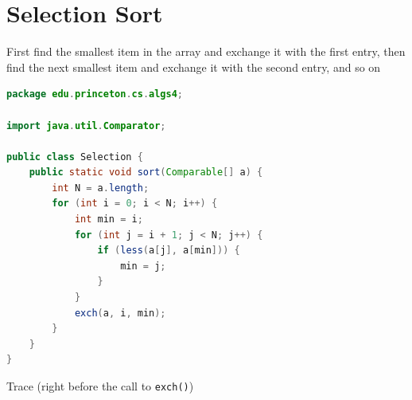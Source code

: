 \documentclass[8pt,a4paper,compress]{beamer}
\begin{document}
\section{Selection Sort}
\begin{frame}[fragile]
\pause

First find the smallest item in the array and exchange it with the first entry, then find the next smallest item and exchange it with the second entry, and so on

\pause
\bigskip

\begin{lstlisting}[language=Java]
package edu.princeton.cs.algs4;

import java.util.Comparator;

public class Selection {
    public static void sort(Comparable[] a) {
        int N = a.length;
        for (int i = 0; i < N; i++) {
            int min = i;
            for (int j = i + 1; j < N; j++) {
                if (less(a[j], a[min])) { 
                    min = j;
                }
            }
            exch(a, i, min);
        }
    }
}
\end{lstlisting}
\end{frame}

\begin{frame}[fragile]
\pause

Trace (right before the call to \lstinline{exch()})
\begin{center}
\end{center}
\end{frame}
\end{document}

